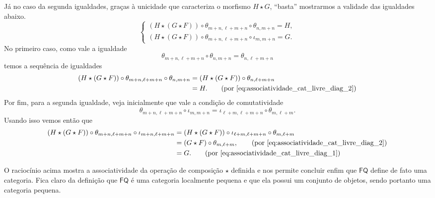 Já no caso da segunda igualdades, graças à unicidade que caracteriza o morfismo $H \star G$, ``basta'' mostrarmos a validade das igualdades abaixo.
\begin{displaymath}
    \begin{cases}
        (H \star (G \star F)) \circ \theta_{m+n,\ell+m+n} \circ \theta_{n,m+n} = H, \\
        (H \star (G \star F)) \circ \theta_{m+n,\ell+m+n} \circ \iota_{m,m+n} = G.
    \end{cases}
\end{displaymath}
No primeiro caso, como vale a igualdade
\begin{displaymath}
    \theta_{m+n,\ell+m+n} \circ \theta_{n,m+n}
    = \theta_{n,\ell+m+n}
\end{displaymath}
temos a sequência de igualdades
\begin{align*}
    (H \star (G \star F)) \circ \theta_{m+n,\ell+m+n} \circ \theta_{n,m+n}
    & = (H \star (G \star F)) \circ \theta_{n,\ell+m+n} \\
    & = H. \tag{por \eqref{eq:associatividade_cat_livre_diag_2}}
\end{align*}
Por fim, para a segunda igualdade, veja inicialmente que vale a condição de comutatividade
\begin{displaymath}
    \theta_{m+n,\ell+m+n} \circ \iota_{m,m+n}
    = \iota_{\ell+m,\ell+m+n} \circ \theta_{m,\ell+m}.
\end{displaymath}
Usando isso vemos então que
\begin{align*}
    (H \star (G \star F)) \circ \theta_{m+n,\ell+m+n} \circ \iota_{m+n,\ell+m+n}
    & = (H \star (G \star F)) \circ \iota_{\ell+m,\ell+m+n} \circ \theta_{m,\ell+m} \\
    & = (G \star F) \circ \theta_{m,\ell+m},
    \tag{por \eqref{eq:associatividade_cat_livre_diag_2}} \\
    & = G.
    \tag{por \eqref{eq:associatividade_cat_livre_diag_1}}
\end{align*}

O raciocínio acima mostra a associatividade da operação de composição $\star$ definida e nos permite concluir enfim que $\mathsf{FQ}$ define de fato uma categoria.
Fica claro da definição que $\mathsf{FQ}$ é uma categoria localmente pequena e que ela possui um conjunto de objetos, sendo portanto uma categoria pequena.

